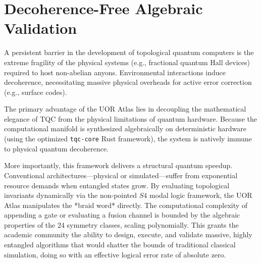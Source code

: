 \section{Decoherence-Free Algebraic Validation}

A persistent barrier in the development of topological quantum computers is the extreme fragility of the physical systems (e.g., fractional quantum Hall devices) required to host non-abelian anyons. Environmental interactions induce decoherence, necessitating massive physical overheads for active error correction (e.g., surface codes).

The primary advantage of the UOR Atlas lies in decoupling the mathematical elegance of TQC from the physical limitations of quantum hardware. Because the computational manifold is synthesized algebraically on deterministic hardware (using the optimized \texttt{tqc-core} Rust framework), the system is natively immune to physical quantum decoherence. 

More importantly, this framework delivers a structural quantum speedup. Conventional architectures---physical or simulated---suffer from exponential resource demands when entangled states grow. By evaluating topological invariants dynamically via the non-pointed $S4$ modal logic framework, the UOR Atlas manipulates the *braid word* directly. The computational complexity of appending a gate or evaluating a fusion channel is bounded by the algebraic properties of the 24 symmetry classes, scaling polynomially. This grants the academic community the ability to design, execute, and validate massive, highly entangled algorithms that would shatter the bounds of traditional classical simulation, doing so with an effective logical error rate of absolute zero.
